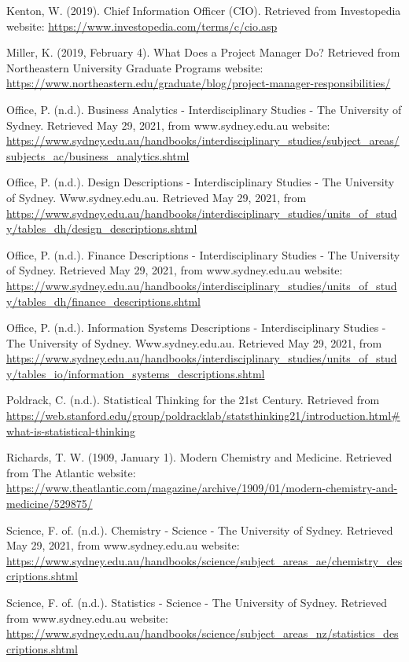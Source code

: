 \documentclass[12pt]{article}
\begin{document}
Kenton, W. (2019). Chief Information Officer (CIO). Retrieved from Investopedia website:
\url{https://www.investopedia.com/terms/c/cio.asp}

Miller, K. (2019, February 4). What Does a Project Manager Do? Retrieved from Northeastern University Graduate Programs website:
\url{https://www.northeastern.edu/graduate/blog/project-manager-responsibilities/}

Office, P. (n.d.). Business Analytics - Interdisciplinary Studies - The University of Sydney. Retrieved May 29, 2021, from www.sydney.edu.au website:
\url{https://www.sydney.edu.au/handbooks/interdisciplinary\_studies/subject\_areas/subjects\_ac/business\_analytics.shtml}

Office, P. (n.d.). Design Descriptions - Interdisciplinary Studies - The University of Sydney. Www.sydney.edu.au. Retrieved May 29, 2021, from
\url{ https://www.sydney.edu.au/handbooks/interdisciplinary_studies/units_of_study/tables_dh/design_descriptions.shtml}

Office, P. (n.d.). Finance Descriptions - Interdisciplinary Studies - The University of Sydney. Retrieved May 29, 2021, from www.sydney.edu.au website:
\url{https://www.sydney.edu.au/handbooks/interdisciplinary\_studies/units\_of\_study/tables\_dh/finance\_descriptions.shtml}

Office, P. (n.d.). Information Systems Descriptions - Interdisciplinary Studies - The University of Sydney. Www.sydney.edu.au. Retrieved May 29, 2021, from
\url{https://www.sydney.edu.au/handbooks/interdisciplinary_studies/units_of_study/tables_io/information_systems_descriptions.shtml}

Poldrack, C. (n.d.). Statistical Thinking for the 21st Century. Retrieved from
\url{https://web.stanford.edu/group/poldracklab/statsthinking21/introduction.html#what-is-statistical-thinking}

Richards, T. W. (1909, January 1). Modern Chemistry and Medicine. Retrieved from The Atlantic website:
\url{https://www.theatlantic.com/magazine/archive/1909/01/modern-chemistry-and-medicine/529875/}

Science, F. of. (n.d.). Chemistry - Science - The University of Sydney. Retrieved May 29, 2021, from www.sydney.edu.au website:
\url{https://www.sydney.edu.au/handbooks/science/subject_areas_ae/chemistry_descriptions.shtml}

Science, F. of. (n.d.). Statistics - Science - The University of Sydney. Retrieved from www.sydney.edu.au website:
\url{https://www.sydney.edu.au/handbooks/science/subject\_areas\_nz/statistics\_descriptions.shtml}
\end{document}
